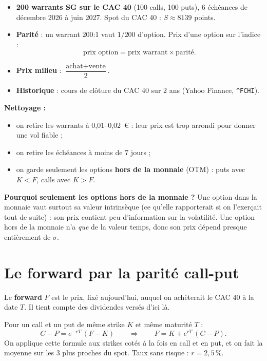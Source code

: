 \documentclass[11pt,a4paper]{article}
\begin{document}
\begin{itemize}[leftmargin=*]
  \item \textbf{200 warrants SG sur le CAC 40} (100 calls, 100 puts), 6 échéances de
        décembre 2026 à juin 2027. Spot du CAC 40 : $S \approx 8139$ points.
  \item \textbf{Parité} : un warrant 200:1 vaut $1/200$ d'option. Prix d'une option sur l'indice :
        \[ \text{prix option} = \text{prix warrant} \times \text{parité}. \]
  \item \textbf{Prix milieu} : $\dfrac{\text{achat} + \text{vente}}{2}$.
  \item \textbf{Historique} : cours de clôture du CAC 40 sur 2 ans (Yahoo Finance, \texttt{\^{}FCHI}).
\end{itemize}

\textbf{Nettoyage :}
\begin{itemize}[leftmargin=*]
  \item on retire les warrants à 0,01--0,02~€ : leur prix est trop arrondi pour donner une vol fiable ;
  \item on retire les échéances à moins de 7 jours ;
  \item on garde seulement les options \textbf{hors de la monnaie} (OTM) : puts avec $K < F$, calls avec $K > F$.
\end{itemize}

\begin{aretenir}
\textbf{Pourquoi seulement les options hors de la monnaie ?} Une option dans la monnaie vaut surtout
sa valeur intrinsèque (ce qu'elle rapporterait si on l'exerçait tout de suite) : son prix contient peu
d'information sur la volatilité. Une option hors de la monnaie n'a \emph{que} de la valeur temps,
donc son prix dépend presque entièrement de $\sigma$.
\end{aretenir}

\section{Le forward par la parité call-put}

Le \textbf{forward} $F$ est le prix, fixé aujourd'hui, auquel on achèterait le CAC 40 à la date $T$.
Il tient compte des dividendes versés d'ici là.

Pour un call et un put de même strike $K$ et même maturité $T$ :
\[
  C - P = e^{-rT}\,(F - K)
  \qquad\Longrightarrow\qquad
  F = K + e^{rT}\,(C - P).
\]
On applique cette formule aux strikes cotés à la fois en call et en put, et on fait la moyenne sur
les 3 plus proches du spot. Taux sans risque : $r = 2{,}5\,\%$.
\end{document}

